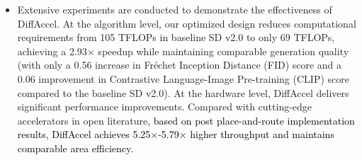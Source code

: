 \begin{itemize}
\item{} Extensive experiments are conducted to demonstrate the effectiveness of DiffAccel. At the algorithm level, our optimized design reduces computational requirements from 105 TFLOPs in baseline SD v2.0 to only 69 TFLOPs, achieving a 2.93$\times$ speedup while maintaining comparable generation quality (with only a 0.56 increase in Fréchet Inception Distance (FID) score and a 0.06 improvement in Contrastive Language-Image Pre-training (CLIP) score compared to the baseline SD v2.0). At the hardware level, DiffAccel delivers significant performance improvements. Compared with cutting-edge accelerators in open literature, \textcolor{black}{based on post place-and-route implementation results, DiffAccel achieves 5.25$\times$-5.79$\times$ higher throughput and maintains comparable area efficiency.}
\end{itemize}